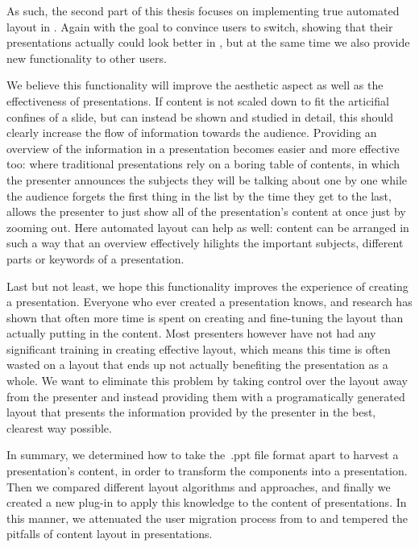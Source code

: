  As such, the second part of this thesis focuses on implementing true
  automated layout in \mxp. Again with the goal to convince \ppt* users to
  switch, showing that their presentations actually could look better in \mxp,
  but at the same time we also provide new functionality to other \mxp users.

  We believe this functionality will improve the aesthetic aspect as well as
  the effectiveness of presentations. If content is not scaled down to fit the
  articifial confines of a slide, but can instead be shown and studied in
  detail, this should clearly increase the flow of information towards the
  audience. Providing an overview of the information in a presentation becomes
  easier and more effective too: where traditional presentations rely on a
  boring table of contents, in which the presenter announces the subjects
  they will be talking about one by one while the audience forgets the first
  thing in the list by the time they get to the last, \mxp allows the presenter
  to just show all of the presentation's content at once just by zooming out.
  Here automated layout can help as well: content can be arranged in such a way
  that an overview effectively hilights the important subjects, different parts
  or keywords of a presentation.

  Last but not least, we hope this functionality improves the experience of
  creating a presentation. Everyone who ever created a presentation knows, and
  research has shown \citep{lok-1} that often more time is spent on creating
  and fine-tuning the layout than actually putting in the content. Most
  presenters however have not had any significant training in creating
  effective layout, which means this time is often wasted on a layout that ends
  up not actually benefiting the presentation as a whole. We want to eliminate
  this problem by taking control over the layout away from the presenter and
  instead providing them with a programatically generated layout that presents
  the information provided by the presenter in the best, clearest way possible.

  In summary, we determined how to take the\ .ppt file format apart to harvest
  a \ppt presentation's content, in order to transform the components into a
  \mxp presentation. Then we compared different layout algorithms and
  approaches, and finally we created a new \mxp plug-in to apply this knowledge
  to the content of \mxp presentations. In this manner, we attenuated the user
  migration process from \ppt to \mxp and tempered the pitfalls of content
  layout in presentations.
